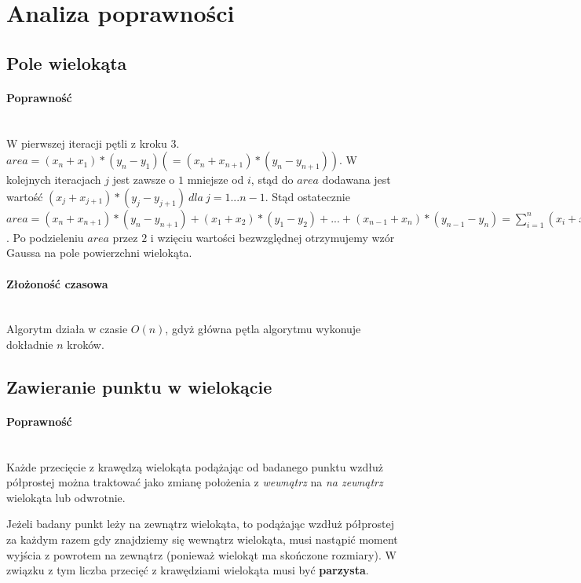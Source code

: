 \documentclass{article}
\begin{document}
\section{Analiza poprawności}

\subsection{Pole wielokąta}
\paragraph{Poprawność} \mbox{}\\
W pierwszej iteracji pętli z kroku 3. \(area = (x_n+x_1)*(y_n-y_1) (=(x_n+x_{n+1})*(y_n-y_{n+1}))\). W kolejnych iteracjach \(j\) jest zawsze o \(1\) mniejsze od \(i\), stąd do \(area\) dodawana jest wartość \((x_j+x_{j+1})*(y_j-y_{j+1})\ dla\ j = 1...n-1\). Stąd ostatecznie \(area = (x_n+x_{n+1})*(y_n-y_{n+1}) + (x_1+x_2)*(y_1-y_2) + ... + (x_{n-1}+x_n)*(y_{n-1}-y_{n}) = \sum\limits_{i=1}^n (x_i+x_{i+1})*(y_{i+1}-y_i)\). Po podzieleniu \(area\) przez \(2\) i wzięciu wartości bezwzględnej otrzymujemy wzór Gaussa na pole powierzchni wielokąta.


\paragraph{Złożoność czasowa} \mbox{}\\
Algorytm działa w czasie \(O(n)\), gdyż główna pętla algorytmu wykonuje dokładnie \(n\) kroków.


\subsection{Zawieranie punktu w wielokącie}

\paragraph{Poprawność} \mbox{}\\
Każde przecięcie z krawędzą wielokąta podążając od badanego punktu wzdłuż półprostej można traktować jako zmianę położenia z \emph{wewnątrz} na \emph{na zewnątrz} wielokąta lub odwrotnie.

Jeżeli badany punkt leży na zewnątrz wielokąta, to podążając wzdłuż półprostej za każdym razem gdy znajdziemy się wewnątrz wielokąta, musi nastąpić moment wyjścia z powrotem na zewnątrz (ponieważ wielokąt ma skończone rozmiary). W związku z tym liczba przecięć z krawędziami wielokąta musi być \textbf{parzysta}.
\end{document}
